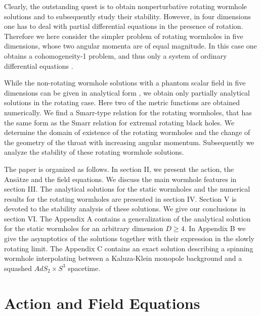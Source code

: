 \documentclass[showpacs,preprintnumbers,amsmath,amssymb,floatfix]{revtex4}
\begin{document}
Clearly, the outstanding quest is to obtain  nonperturbative
rotating wormhole solutions and to subsequently study their stability.
However, in four dimensions one has to deal with partial differential equations
in the presence of rotation. 
Therefore we here consider  the simpler problem
of rotating wormholes in five dimensions,
whose two angular momenta are of equal magnitude.
In this case
one obtains a cohomogeneity-1 problem, and thus 
only a system of ordinary differential equations 
\cite{Kunz:2005nm,Hartmann:2010pm}.


While the non-rotating wormhole solutions
with a phantom scalar field in five dimensions
can be given in analytical form \cite{Shinkai:2013}, we obtain 
only partially analytical solutions in the rotating case.
Here two of the metric functions are obtained numerically.
We find a Smarr-type relation for the
rotating wormholes, that has the same form as 
the Smarr relation for extremal rotating black holes.
We determine the domain of existence of the rotating wormholes
and the change of the geometry of the throat with 
increasing angular momentum.
Subsequently we analyze the
stability of these rotating wormhole solutions.

The paper is organized as follows.
In section II, we present
the action, the Ans\"atze and the field equations.
We discuss the main wormhole features in section III.
The analytical solutions for the
static wormholes and the numerical results for the 
rotating wormholes
are presented in section IV.
Section V is devoted to the stability analysis of these solutions.
We give our conclusions in section VI.
The Appendix A contains a generalization of the analytical solution  for the
static wormholes for an arbitrary dimension $D\geq 4$.
In Appendix B we give the asymptotics of the solutions together
with their expression in the slowly rotating limit. 
The Appendix C contains
 an exact solution describing
a spinning wormhole interpolating between a 
Kaluza-Klein monopole background and a squashed
 $AdS_2\times S^3$ spacetime.


\section{Action and Field Equations}
\end{document}
